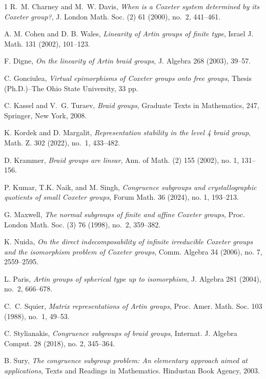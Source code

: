 \documentclass[12pt]{amsart}
\theoremstyle{definition}
\numberwithin{equation}{section}
\begin{document}
\begin{thebibliography}{1}
 R.~M. Charney and M.~W. Davis, {\it When is a Coxeter system determined by its Coxeter group?},  J. London Math. Soc. (2)  61 (2000), no.~2, 441--461.

 A. M. Cohen and D. B. Wales, {\it Linearity of Artin groups of finite type}, Israel J. Math. 131 (2002), 101--123.


 F. Digne, {\it On the linearity of Artin braid groups}, J. Algebra 268 (2003), 39--57.

 C. Gonciulea, {\it Virtual epimorphisms of Coxeter groups onto free groups}, Thesis (Ph.D.)--The Ohio State University, 33 pp.



 C. Kassel and V.~G. Turaev, {\it Braid groups}, Graduate Texts in Mathematics, 247, Springer, New York, 2008.


 K. Kordek and D. Margalit, {\it Representation stability in the level 4 braid group}, Math. Z.  302 (2022), no.~1, 433--482.

  D. Krammer,   {\it Braid groups are linear}, Ann. of Math. (2) 155 (2002), no. 1, 131--156.

 P. Kumar, T.K. Naik, and M. Singh, {\it Congruence subgroups and crystallographic quotients of small Coxeter groups}, Forum Math. 36 (2024), no. 1, 193--213.

 G. Maxwell, {\it The normal subgroups of finite and affine Coxeter groups}, Proc. London Math. Soc. (3)  76 (1998), no.~2, 359--382.

 K. Nuida, {\it On the direct indecomposability of infinite irreducible Coxeter groups and the isomorphism problem of Coxeter groups}, Comm. Algebra   34 (2006), no. 7, 2559--2595.


 L. Paris, {\it Artin groups of spherical type up to isomorphism}, J. Algebra 281 (2004), no.~2, 666--678.

 C.~C. Squier, {\it Matrix representations of Artin groups}, Proc. Amer. Math. Soc.  103 (1988), no.~1, 49--53.

 C. Stylianakis, {\em Congruence subgroups of braid groups}, Internat. J. Algebra Comput. 28 (2018), no. 2, 345--364.

 B. Sury, {\em The congruence subgroup problem: An elementary approach aimed at applications}, Texts and Readings in Mathematics. Hindustan Book Agency, 2003.
\end{thebibliography}
\end{document}
